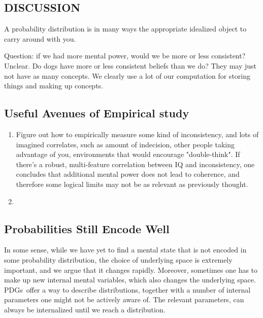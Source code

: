 \documentclass{article}
\newcommand\MaxEnt{_{\mathbf H}}
\newcommand{\MN}{PDG}
\newcommand{\MNs}{\MN s}
\numberwithin{equation}{section}
\begin{document}
\begin{notfocus}
	





	\section{DISCUSSION}
	
	
	A probability distribution is in many ways the appropriate idealized object to carry around with you.
	
	Question: if we had more mental power, would we be more or less consistent? Unclear. Do dogs have more or less consistent beliefs than we do? They may just not have as many concepts. We clearly use a lot of our computation for storing things and making up concepts.
	
	

	
	\begin{vfull}
	\subsection{Useful Avenues of Empirical study}
	
	\begin{enumerate}
		\item Figure out how to empirically measure some kind of inconsistency, and lots of imagined correlates, such as amount of indecision, other people taking advantage of you, environments that would encourage "double-think". If there's a robust, multi-feature correlation between IQ and inconsistency, one concludes that additional mental power does not lead to coherence, and therefore some logical limits may not be as relevant as previously thought.
		\item 
	\end{enumerate}
	\end{vfull}
	
	

	\subsection{Probabilities Still Encode Well}	
	In some sense, while we have yet to find a mental state that is not encoded in some probability distribution, the choice of underlying space is extremely important, and we argue that it changes rapidly. Moreover, sometimes one has to make up new internal mental variables, which also changes the underlying space. \MNs\ offer a way to describe distributions, together with a number of internal parameters one might not be actively aware of. The relevant parameters, can always be internalized  until we reach a distribution. 
	

\end{notfocus}
\end{document}
